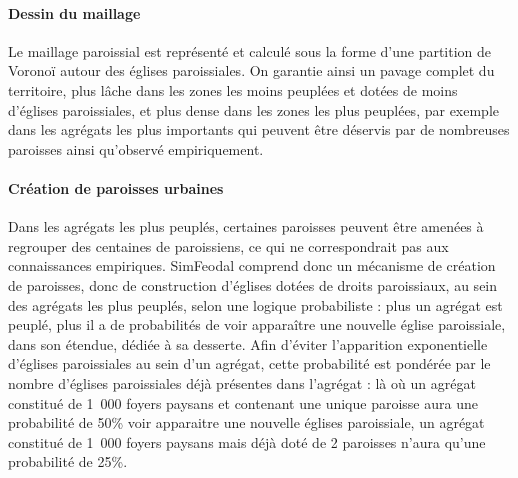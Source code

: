 \paragraph{Dessin du maillage} Le maillage paroissial est représenté et calculé sous la forme d'une partition de Voronoï autour des églises paroissiales. On garantie ainsi un pavage complet du territoire, plus lâche dans les zones les moins peuplées et dotées de moins d'églises paroissiales, et plus dense dans les zones les plus peuplées, par exemple dans les agrégats les plus importants qui peuvent être déservis par de nombreuses paroisses ainsi qu'observé empiriquement.

\paragraph{Création de paroisses \og urbaines\fg{}} Dans les agrégats les plus peuplés, certaines paroisses peuvent être amenées à regrouper des centaines de paroissiens, ce qui ne correspondrait pas aux connaissances empiriques.
SimFeodal comprend donc un mécanisme de création de paroisses, donc de construction d'églises dotées de droits paroissiaux, au sein des agrégats les plus peuplés, selon une logique probabiliste : plus un agrégat est peuplé, plus il a de probabilités de voir apparaître une nouvelle église paroissiale, dans son étendue, dédiée à sa desserte.
Afin d'éviter l'apparition exponentielle d'églises paroissiales au sein d'un agrégat, cette probabilité est pondérée par le nombre d'églises paroissiales déjà présentes dans l'agrégat : là où un agrégat constitué de 1~000 foyers paysans et contenant une unique paroisse aura une probabilité de 50\% voir apparaitre une nouvelle églises paroissiale, un agrégat constitué de 1~000 foyers paysans mais déjà doté de 2 paroisses n'aura qu'une probabilité de 25\%.

